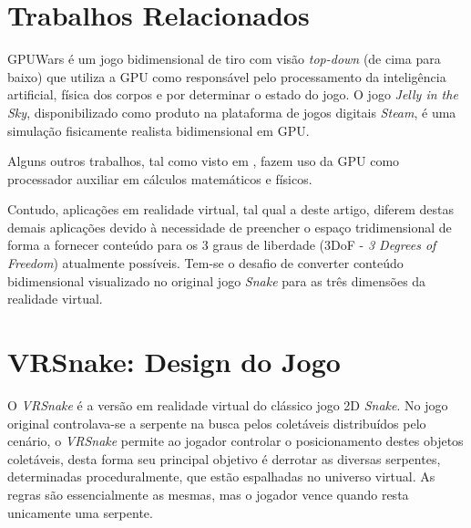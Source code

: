 \documentclass[conference]{IEEEtran}
\begin{document}
\section{Trabalhos Relacionados} \label{sec:relatedworks}

GPUWars \cite{GPGPUWars} é um jogo bidimensional de tiro com visão \textit{top-down} (de cima para baixo) que utiliza a GPU como responsável pelo processamento da inteligência artificial, física dos corpos e por determinar o estado do jogo. O jogo \textit{Jelly in the Sky}, disponibilizado como produto na plataforma de jogos digitais \textit{Steam}, é uma simulação fisicamente realista bidimensional em GPU.

Alguns outros trabalhos, tal como visto em \cite{Joselli:2010:AGL:1658866.1658869}, fazem uso da GPU como processador auxiliar em cálculos matemáticos e físicos. 

Contudo, aplicações em realidade virtual, tal qual a deste artigo, diferem destas demais aplicações devido à necessidade de preencher o espaço tridimensional de forma a fornecer conteúdo para os 3 graus de liberdade (3DoF - \textit{3 Degrees of Freedom}) atualmente possíveis. Tem-se o desafio de converter conteúdo bidimensional visualizado no original jogo \textit{Snake} para as três dimensões da realidade virtual.

\section{VRSnake: Design do Jogo} \label{sec:vrsnake}
O \textit{VRSnake} é a versão em realidade virtual do clássico jogo 2D \textit{Snake}. No jogo original controlava-se a serpente na busca pelos coletáveis distribuídos pelo cenário, o \textit{VRSnake} permite ao jogador controlar o posicionamento destes objetos coletáveis, desta forma seu principal objetivo é derrotar as diversas serpentes, determinadas proceduralmente, que estão espalhadas no universo virtual. As regras são essencialmente as mesmas, mas o jogador vence quando resta unicamente uma serpente.

\end{document}
